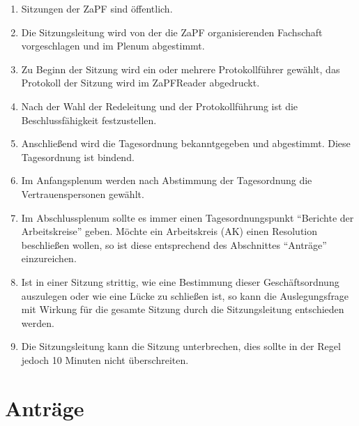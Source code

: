\documentclass[draft,12pt,oneside]{scrreprt}
\begin{document}
\begin{enumerate}
  \item Sitzungen der ZaPF sind öffentlich.

  \item Die Sitzungsleitung wird von der die ZaPF organisierenden Fachschaft
        vorgeschlagen und im Plenum abgestimmt.

  \item Zu Beginn der Sitzung wird ein oder mehrere Protokollführer gewählt,
        das Protokoll der Sitzung wird im ZaPFReader abgedruckt.

  \item Nach der Wahl der Redeleitung und der Protokollführung ist die
        Beschlussfähigkeit festzustellen.

  \item Anschließend wird die Tagesordnung bekanntgegeben und abgestimmt.
        Diese Tagesordnung ist bindend.

  \item Im Anfangsplenum werden nach Abstimmung der Tagesordnung die
        Vertrauenspersonen gewählt.

  \item Im Abschlussplenum sollte es immer einen Tagesordnungspunkt ``Berichte
        der Arbeitskreise'' geben.
        Möchte ein Arbeitskreis (AK) einen Resolution beschließen wollen, so
        ist diese entsprechend des Abschnittes ``Anträge'' einzureichen.

  \item Ist in einer Sitzung strittig, wie eine Bestimmung dieser Geschäftsordnung
        auszulegen oder wie eine Lücke zu schließen ist, so kann die Auslegungsfrage
        mit Wirkung für die gesamte Sitzung durch die Sitzungsleitung entschieden
        werden.

  \item Die Sitzungsleitung kann die Sitzung unterbrechen, dies sollte in der
        Regel jedoch 10 Minuten nicht überschreiten.
\end{enumerate}

\section{Anträge}
\end{document}
